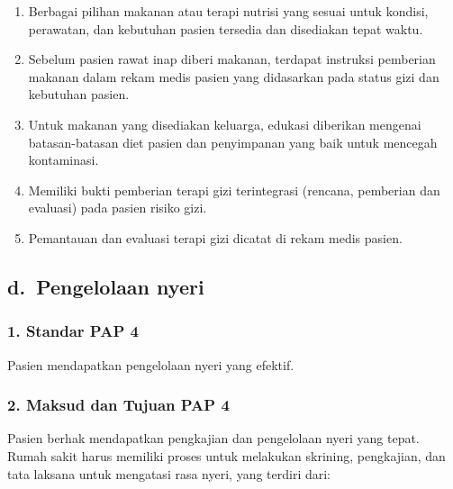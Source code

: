 \documentclass[
]{book}
\providecommand{\tightlist}{%
  \setlength{\itemsep}{0pt}\setlength{\parskip}{0pt}}
\begin{document}
\begin{enumerate}
\def\labelenumi{\alph{enumi}.}
\tightlist
\item
  Berbagai pilihan makanan atau terapi nutrisi yang sesuai untuk kondisi, perawatan, dan kebutuhan pasien tersedia dan disediakan tepat waktu.
\item
  Sebelum pasien rawat inap diberi makanan, terdapat instruksi pemberian makanan dalam rekam medis pasien yang didasarkan pada status gizi dan kebutuhan pasien.
\item
  Untuk makanan yang disediakan keluarga, edukasi diberikan mengenai batasan-batasan diet pasien dan penyimpanan yang baik untuk mencegah kontaminasi.
\item
  Memiliki bukti pemberian terapi gizi terintegrasi (rencana, pemberian dan evaluasi) pada pasien risiko gizi.
\item
  Pemantauan dan evaluasi terapi gizi dicatat di rekam medis pasien.
\end{enumerate}

\hypertarget{d.-pengelolaan-nyeri}{%
\subsection*{d.~Pengelolaan nyeri}\label{d.-pengelolaan-nyeri}}

\hypertarget{standar-pap-4}{%
\subsubsection*{1. Standar PAP 4}\label{standar-pap-4}}

Pasien mendapatkan pengelolaan nyeri yang efektif.

\hypertarget{maksud-dan-tujuan-pap-4}{%
\subsubsection*{2. Maksud dan Tujuan PAP 4}\label{maksud-dan-tujuan-pap-4}}

Pasien berhak mendapatkan pengkajian dan pengelolaan nyeri yang tepat. Rumah sakit harus memiliki proses untuk melakukan skrining, pengkajian, dan tata laksana untuk mengatasi rasa nyeri, yang terdiri dari:
\end{document}
